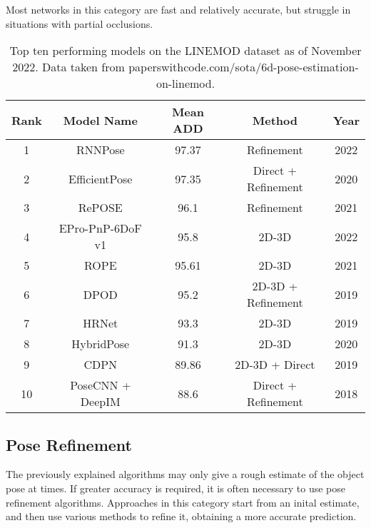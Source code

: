 Most networks in this category are fast and relatively accurate, but struggle in situations with partial occlusions.

\begin{table}[ht]
    \begin{center}
        \begin{tabular}{||c c c c c||} 
        \hline
        Rank & Model Name & Mean ADD & Method & Year\\ [0.5ex] 
        \hline\hline
        1 & RNNPose & 97.37 & Refinement & 2022 \\ 
        \hline
        2 & EfficientPose & 97.35 & Direct + Refinement & 2020 \\
        \hline
        3 & RePOSE & 96.1 & Refinement & 2021 \\
        \hline
        4 & EPro-PnP-6DoF v1 & 95.8 & 2D-3D & 2022\\
        \hline
        5 & ROPE & 95.61 & 2D-3D & 2021 \\
        \hline
        6 & DPOD & 95.2 & 2D-3D + Refinement & 2019\\
        \hline
        7 & HRNet  & 93.3 & 2D-3D & 2019 \\
        \hline
        8 & HybridPose & 91.3 & 2D-3D & 2020 \\
        \hline
        9 & CDPN & 89.86 & 2D-3D + Direct & 2019 \\
        \hline
        10 & PoseCNN + DeepIM & 88.6 & Direct + Refinement & 2018\\
        \hline
        \end{tabular}
    \caption{Top ten performing models on the LINEMOD dataset\cite{linemod} as of November 2022. Data taken from paperswithcode.com/sota/6d-pose-estimation-on-linemod.}
    \label{tab:top10models}
    \end{center}
\end{table}

\subsection{Pose Refinement}
\label{ss:poserefinement}

The previously explained algorithms may only give a rough estimate of the object pose at times. If greater accuracy is required, it is often necessary to use pose refinement algorithms. Approaches in this category start from an inital estimate, and then use various methods to refine it, obtaining a more accurate prediction.

